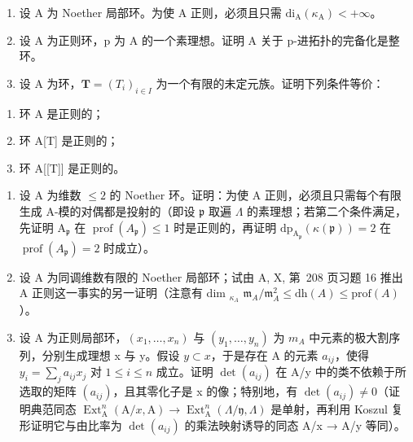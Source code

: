 
\begin{enumerate}
\def\labelenumi{\arabic{enumi})}
\item
  设 A 为 Noether 局部环。为使 A 正则，必须且只需 \(\mathrm{di}_{\mathrm{A}}(\kappa_{\mathrm{A}})<+\infty\)。
\item
  设 A 为正则环，p 为 A 的一个素理想。证明 A 关于 p-进拓扑的完备化是整环。
\item
  设 A 为环，\(\mathbf{T} = (T_i)_{i\in I}\) 为一个有限的未定元族。证明下列条件等价：
\end{enumerate}

\begin{enumerate}
\def\labelenumi{(\roman{enumi})}
\item
  环 A 是正则的；
\item
  环 A{[}T{]} 是正则的；
\item
  环 A{[}{[}T{]}{]} 是正则的。
\end{enumerate}

\begin{enumerate}
\def\labelenumi{\arabic{enumi})}
\setcounter{enumi}{3}
\item
  设 A 为维数 \(\leqslant 2\) 的 Noether 环。证明：为使 A 正则，必须且只需每个有限生成 A-模的对偶都是投射的（即设 \(\mathfrak{p}\) 取遍 \(\Lambda\) 的素理想；若第二个条件满足，先证明 \(\mathrm{A}_{\mathfrak{p}}\) 在 \(\operatorname{prof}(A_{\mathfrak{p}}) \leqslant 1\) 时是正则的，再证明 \(\mathrm{dp}_{\mathrm{A}_{\mathfrak{p}}}(\kappa(\mathfrak{p})) = 2\) 在 \(\operatorname{prof}(A_{\mathfrak{p}}) = 2\) 时成立）。
\item
  设 A 为同调维数有限的 Noether 局部环；试由 A, X, 第~208 页习题 16 推出 A 正则这一事实的另一证明（注意有 dim \(_{\kappa_A}\) \(\mathfrak{m}_A/\mathfrak{m}_A^2 \leqslant \mathrm{dh}(A) \leqslant \mathrm{prof}(A)\)）。
\item
  设 A 为正则局部环，\((x_{1},\ldots,x_{n})\) 与 \((y_{1},\ldots,y_{n})\) 为 \(m_{A}\) 中元素的极大割序列，分别生成理想 x 与 y。假设 \(y \subset x\)，于是存在 A 的元素 \(a_{ij}\)，使得 \(y_{i} = \sum_{j} a_{ij} x_{j}\) 对 \(1 \leqslant i \leqslant n\) 成立。证明 \(\det(a_{ij})\) 在 A/y 中的类不依赖于所选取的矩阵 \((a_{ij})\)，且其零化子是 x 的像；特别地，有 \(\det(a_{ij}) \neq 0\)（证明典范同态 \(\operatorname{Ext}_{\mathrm{A}}^{n}(\mathrm{A}/x,\mathrm{A}) \to \operatorname{Ext}_{\mathrm{A}}^{n}(\Lambda/\mathfrak{y},\Lambda)\) 是单射，再利用 Koszul 复形证明它与由比率为 \(\det(a_{ij})\) 的乘法映射诱导的同态 A/x → A/y 等同）。
\end{enumerate}

